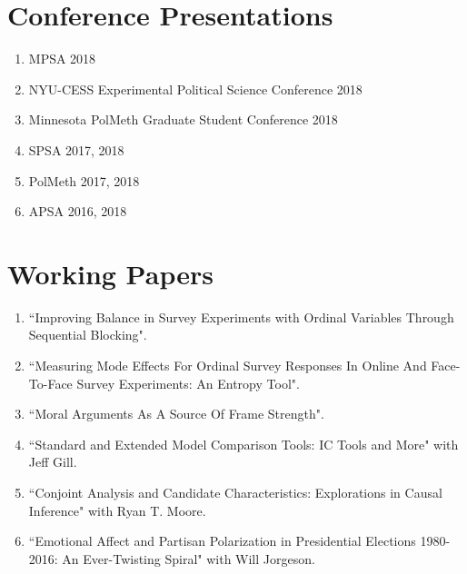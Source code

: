 \documentclass[10pt]{article}
\begin{document}
\begin{flushleft}
\section*{Conference Presentations}

\begin{enumerate}[leftmargin=!,labelindent=20pt,itemindent=-20pt]
\item[] MPSA 2018
\vspace{-0.27cm}
\item[] NYU-CESS Experimental Political Science Conference 2018
\vspace{-0.27cm}
\item[] Minnesota PolMeth Graduate Student Conference 2018
\vspace{-0.27cm}
\item[] SPSA 2017, 2018
\vspace{-0.27cm}
\item[] PolMeth 2017, 2018
\vspace{-0.27cm}
\item[] APSA 2016, 2018
\end{enumerate}


\section*{Working Papers}

\begin{enumerate}[leftmargin=!,labelindent=20pt,itemindent=-20pt]
\item[] ``Improving Balance in Survey Experiments with Ordinal Variables Through Sequential Blocking".
\vspace{-0.27cm}
\item[] ``Measuring Mode Effects For Ordinal Survey Responses In Online And Face-To-Face Survey Experiments: An Entropy Tool".
\vspace{-0.27cm}
\item[] ``Moral Arguments As A Source Of Frame Strength".
\vspace{-0.27cm}
\item[] ``Standard and Extended Model Comparison Tools: IC Tools and More" with Jeff Gill.
\vspace{-0.27cm}
\item[] ``Conjoint Analysis and Candidate Characteristics: Explorations in Causal Inference" with Ryan T. Moore.
\vspace{-0.27cm}
\item[] ``Emotional Affect and Partisan Polarization in Presidential Elections 1980-2016: An Ever-Twisting Spiral" with Will Jorgeson.
\end{enumerate}







\end{flushleft}
\end{document}
